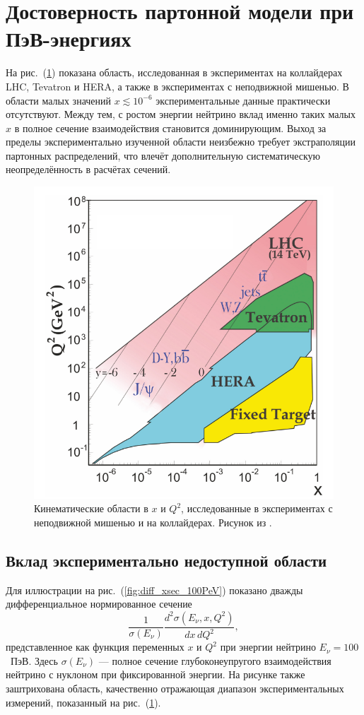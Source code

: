 \section{Достоверность партонной модели при ПэВ-энергиях}
\label{sec:dis_reliability}

На рис.~(\ref{fig:xQ2_PDG}) показана область, исследованная в экспериментах на коллайдерах LHC, Tevatron и HERA, а также в экспериментах с неподвижной мишенью. 
В области малых значений $x \lesssim 10^{-6}$ экспериментальные данные практически отсутствуют. 
Между тем, с ростом энергии нейтрино вклад именно таких малых $x$ в полное сечение взаимодействия становится доминирующим. 
Выход за пределы экспериментально изученной области неизбежно требует экстраполяции партонных распределений, что влечёт дополнительную систематическую неопределённость в расчётах сечений.
\begin{figure}[!h]
\centering
\includegraphics[width=0.8\linewidth]{images/NuProp/reald}
\caption{Кинематические области в $x$ и $Q^2$, исследованные в экспериментах с неподвижной мишенью и на коллайдерах. Рисунок из \cite{ParticleDataGroup:2024cfk}.}
\label{fig:xQ2_PDG}
\end{figure}

\subsection{Вклад экспериментально недоступной области}

Для иллюстрации на рис.~(\ref{fig:diff_xsec_100PeV}) показано дважды дифференциальное нормированное сечение
\[
\frac{1}{\sigma(E_\nu)}\frac{d^2\sigma(E_\nu,x,Q^2)}{dx\,dQ^2},
\]
представленное как функция переменных $x$ и $Q^2$ при энергии нейтрино $E_{\nu} = 100$~ПэВ. 
Здесь $\sigma(E_\nu)$ — полное сечение глубоконеупругого взаимодействия нейтрино с нуклоном при фиксированной энергии. 
На рисунке также заштрихована область, качественно отражающая диапазон экспериментальных измерений, показанный на рис.~(\ref{fig:xQ2_PDG}).

